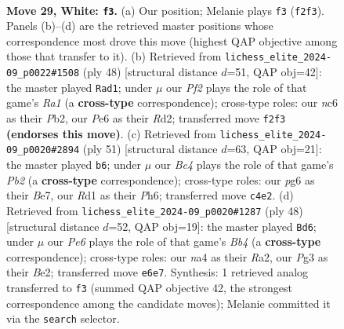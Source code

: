 \documentclass[11pt]{article}
\begin{document}
\clearpage

\begin{figure}[p]\centering
\begin{subfigure}{0.46\textwidth}\centering
\resizebox{\linewidth}{!}{%
\newchessgame
\chessboard[
  setfen={2b4r/r5k1/p1n1P1p1/p4pNp/n1B2B2/P5P1/1P3P1P/RK1R4 w - - 1 29},
  showmover=false,
  pgfstyle=straightmove, color=movearrow, markmove={f2-f3}
]}
\caption{}
\end{subfigure}\hfill
\begin{subfigure}{0.46\textwidth}\centering
\resizebox{\linewidth}{!}{%
\newchessgame
\chessboard[
  setfen={r2r2k1/1p3pp1/p1b4p/2n1p3/4P3/P1B2PP1/1P1R2BP/R5K1 w - - 0 25},
  showmover=false,
  pgfstyle=straightmove, color=movearrow, markmove={a1-d1}
]}
\caption{}
\end{subfigure}
\\[4pt]
\begin{subfigure}{0.46\textwidth}\centering
\resizebox{\linewidth}{!}{%
\newchessgame
\chessboard[
  setfen={1k5r/np2bpp1/p3p2p/1b1pP3/3P4/2P1N3/1R1B1PPP/3R2K1 b - - 6 26},
  showmover=false,
  pgfstyle=straightmove, color=movearrow, markmove={b7-b6}
]}
\caption{}
\end{subfigure}\hfill
\begin{subfigure}{0.46\textwidth}\centering
\resizebox{\linewidth}{!}{%
\newchessgame
\chessboard[
  setfen={r1r3k1/pp3ppp/2n5/3p1P2/PB1Pb1P1/2P5/R3B2P/5RK1 w - - 5 25},
  showmover=false,
  pgfstyle=straightmove, color=movearrow, markmove={b4-d6}
]}
\caption{}
\end{subfigure}
\caption{\textbf{Move 29, White: \texttt{f3}.} (a) Our position; Melanie plays \texttt{f3} (\texttt{f2f3}). Panels (b)--(d) are the retrieved master positions whose correspondence most drove this move (highest QAP objective among those that transfer to it). (b) Retrieved from \texttt{lichess\_elite\_2024-09\_p0022\#1508} (ply 48) [structural distance $d$=51, QAP obj=42]: the master played \texttt{Rad1}; under $\mu$ our \emph{Pf2} plays the role of that game's \emph{Ra1} (a \textbf{cross-type} correspondence); cross-type roles: our \emph{n}c6 as their \emph{P}b2, our \emph{P}e6 as their \emph{R}d2; transferred move \texttt{f2f3} \textbf{(endorses this move)}. (c) Retrieved from \texttt{lichess\_elite\_2024-09\_p0020\#2894} (ply 51) [structural distance $d$=63, QAP obj=21]: the master played \texttt{b6}; under $\mu$ our \emph{Bc4} plays the role of that game's \emph{Pb2} (a \textbf{cross-type} correspondence); cross-type roles: our \emph{p}g6 as their \emph{B}e7, our \emph{R}d1 as their \emph{P}h6; transferred move \texttt{c4e2}. (d) Retrieved from \texttt{lichess\_elite\_2024-09\_p0020\#1287} (ply 48) [structural distance $d$=52, QAP obj=19]: the master played \texttt{Bd6}; under $\mu$ our \emph{Pe6} plays the role of that game's \emph{Bb4} (a \textbf{cross-type} correspondence); cross-type roles: our \emph{n}a4 as their \emph{R}a2, our \emph{P}g3 as their \emph{B}e2; transferred move \texttt{e6e7}. Synthesis: 1 retrieved analog transferred to \texttt{f3} (summed QAP objective 42, the strongest correspondence among the candidate moves); Melanie committed it via the \texttt{search} selector.}
\label{fig:thought-m56}
\end{figure}
\end{document}
